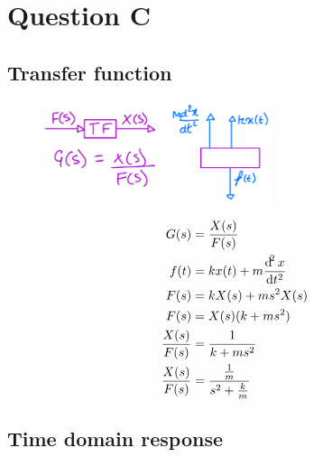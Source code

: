 \documentclass[12pt]{article}
\numberwithin{equation}{section}
\begin{document}
\section{Question C}
\subsection*{Transfer function}
\begin{figure}[H]
  \centering
  \includegraphics[width=0.6\textwidth]{./img/2-4blockdiagram.png}
\end{figure}
\begin{align}
  G(s) &= \frac{X(s)}{F(s)}\\
  f(t) &= kx(t) + m \frac{\dif ^2 x}{\dif t^2}\\
  F(s) &= kX(s) + ms^2 X(s)\\
  F(s) &= X(s) (k + ms^2)\\
  \frac{X(s)}{F(s)} &= \frac{1}{k + ms^2}\\
  \frac{X(s)}{F(s)} &= \frac{\frac{1}{m}}{s^2 + \frac{k}{m}}
\end{align}
\subsection*{Time domain response}
\end{document}
